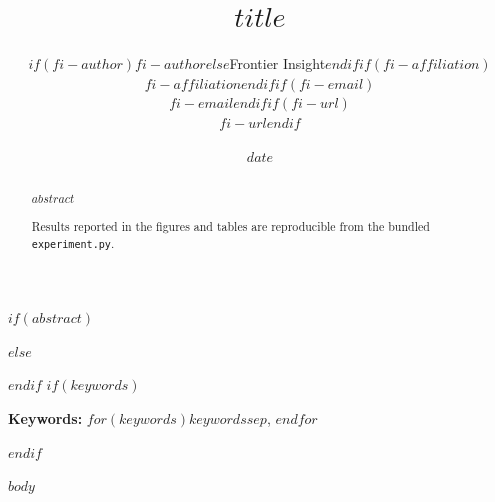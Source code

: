 \documentclass[10pt,letterpaper]{article}
\title{$title$}
\author{$if(fi-author)$$fi-author$$else$Frontier Insight$endif$$if(fi-affiliation)$\\{\small $fi-affiliation$}$endif$$if(fi-email)$\\{\small $fi-email$}$endif$$if(fi-url)$\\{\small $fi-url$}$endif$}
\date{$date$}
\begin{document}
\maketitle

$if(abstract)$
\begin{abstract}
$abstract$
\end{abstract}
$else$
\begin{abstract}
Results reported in the figures and tables are reproducible from the bundled \texttt{experiment.py}.
\end{abstract}
$endif$
$if(keywords)$
{\small\raggedright\noindent\textbf{Keywords:} $for(keywords)$$keywords$$sep$, $endfor$\par}\medskip
$endif$

$body$
\end{document}
